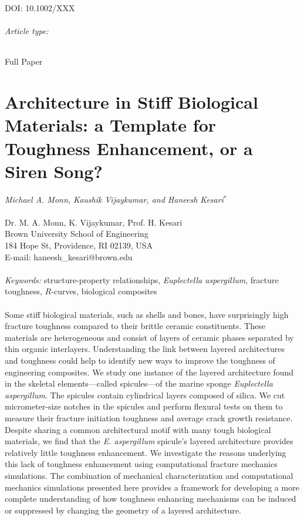 \documentclass[12pt,onecolumn]{article}
\begin{document}
DOI: 10.1002/XXX
\paragraph{Article type:} Full Paper
\part*{Architecture in Stiff Biological Materials: a Template for Toughness Enhancement, or a Siren Song?}
\textit{Michael A. Monn, Kaushik Vijaykumar, and Haneesh Kesari$^*$}
\\
\\
Dr. M. A. Monn, K. Vijaykumar, Prof. H. Kesari
\\
Brown University School of Engineering
\\
184 Hope St, Providence, RI 02139, USA
\\
E-mail: haneesh\_kesari@brown.edu
\\
\\

\doublespacing
\emph{Keywords:}
structure-property relationships, 
\textit{Euplectella aspergillum}, 
fracture toughness, 
$R$-curves, 
biological composites
\\ \\
{
Some stiff biological materials, such as shells and bones, have surprisingly high fracture toughness compared to their brittle ceramic constituents. These materials are heterogeneous and consist of layers of ceramic phases separated by thin organic interlayers. Understanding the link between layered architectures and toughness could help to identify new ways to improve the toughness of engineering composites. We study one instance of the layered architecture found in the skeletal elements---called spicules---of the marine sponge \textit{Euplectella aspergillum}. The spicules contain cylindrical layers composed of silica. We cut micrometer-size notches in the spicules and perform flexural tests on them to measure their fracture initiation toughness and average crack growth resistance. Despite sharing a common architectural motif with many tough biological materials,  we find that the \textit{E. aspergillum} spicule's layered architecture provides relatively little toughness enhancement. We investigate the reasons underlying this lack of toughness enhancement using computational fracture mechanics simulations. The combination of mechanical characterization and computational mechanics simulations presented here provides a framework for developing a more complete understanding of how toughness enhancing mechanisms can be induced or suppressed by changing the geometry of a layered architecture.
}
\end{document}
